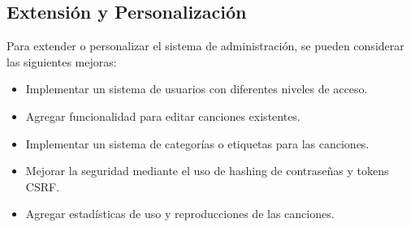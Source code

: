 \documentclass[a4paper,12pt]{article}
\begin{document}
\subsection{Extensión y Personalización}
Para extender o personalizar el sistema de administración, se pueden considerar las siguientes mejoras:

\begin{itemize}
    \item Implementar un sistema de usuarios con diferentes niveles de acceso.
    \item Agregar funcionalidad para editar canciones existentes.
    \item Implementar un sistema de categorías o etiquetas para las canciones.
    \item Mejorar la seguridad mediante el uso de hashing de contraseñas y tokens CSRF.
    \item Agregar estadísticas de uso y reproducciones de las canciones.
\end{itemize}
\end{document}
